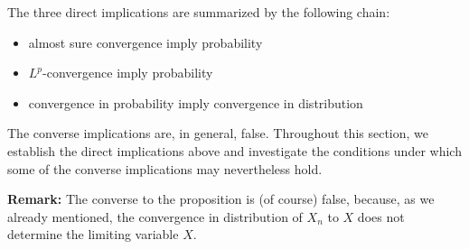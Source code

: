 \documentclass[../Main.tex]{subfiles}
\begin{document}
The three direct implications are summarized by the following chain:
\begin{itemize}
    \item almost sure convergence imply probability
    \item $L^p$-convergence imply probability
    \item convergence in probability imply convergence in distribution
\end{itemize}
The converse implications are, in general, false. Throughout this section, we establish the direct implications above and investigate the conditions under which some of the converse implications may nevertheless hold.

\textbf{Remark:} The converse to the proposition is (of course) false, because, as we already mentioned, the convergence in distribution of $X_n$ to $X$ does not determine the limiting variable $X$. 
\end{document}
